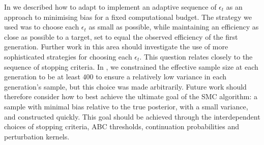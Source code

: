 \documentclass[review,demo]{siamonline190516}
\begin{document}
In  we described how to adapt  to implement an adaptive sequence of $\epsilon_t$ as an approach to minimising bias for a fixed computational budget.
The strategy we used was to choose each $\epsilon_t$ as small as possible, while maintaining an efficiency as close as possible to a target, set to equal the observed efficiency of the first generation.
Further work in this area should investigate the use of more sophisticated strategies for choosing each $\epsilon_t$.
This question relates closely to the sequence of stopping criteria.
In , we constrained the effective sample size at each generation to be at least $400$ to ensure a relatively low variance in each generation's sample, but this choice was made arbitrarily.
Future work should therefore consider how to best achieve the ultimate goal of the SMC algorithm: a sample with minimal bias relative to the true posterior, with a small variance, and constructed quickly.
This goal should be achieved through the interdependent choices of stopping criteria, ABC thresholds, continuation probabilities and perturbation kernels.



\end{document}

